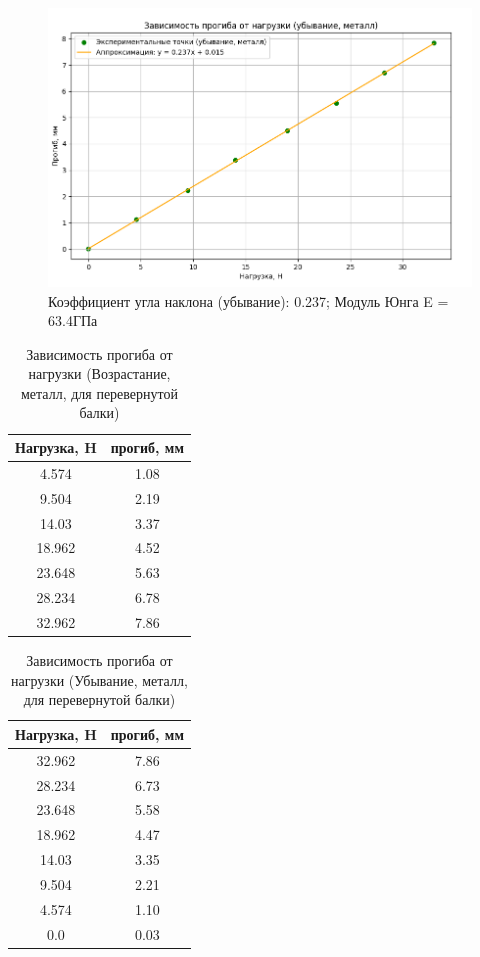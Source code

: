 \documentclass[a4paper, 12pt]{article}
\begin{document}
\vspace{2cm} %

\begin{figure}[h]
\centering
\includegraphics[width=0.8\linewidth]{G4.png}
\caption{Коэффициент угла наклона (убывание): 0.237; Модуль Юнга E = 63.4ГПа}
\label{fig:decrease}
\end{figure}


\clearpage



\begin{table}[h]
\centering
\caption{Зависимость прогиба от нагрузки (Возрастание, металл, для перевернутой балки)}
\begin{tabular}{|c|c|}
\hline
Нагрузка, H & прогиб, мм \\
\hline
4.574 & 1.08 \\
\hline
9.504 & 2.19 \\
\hline
14.03 & 3.37 \\
\hline
18.962 & 4.52 \\
\hline
23.648 & 5.63 \\
\hline
28.234 & 6.78 \\
\hline
32.962 & 7.86 \\
\hline
\end{tabular}
\end{table}

\begin{table}[h]
\centering
\caption{Зависимость прогиба от нагрузки (Убывание, металл, для перевернутой балки)}
\begin{tabular}{|c|c|}
\hline
Нагрузка, H & прогиб, мм \\
\hline
32.962 & 7.86 \\
\hline
28.234 & 6.73 \\
\hline
23.648 & 5.58 \\
\hline
18.962 & 4.47 \\
\hline
14.03 & 3.35 \\
\hline
9.504 & 2.21 \\
\hline
4.574 & 1.10 \\
\hline
0.0 & 0.03 \\
\hline
\end{tabular}
\end{table}
\end{document}
